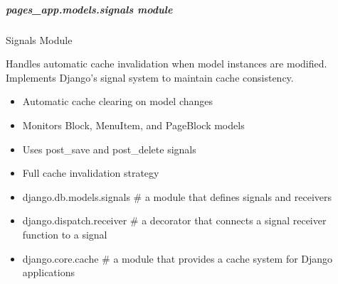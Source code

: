 \documentclass[letterpaper,10pt,english]{sphinxmanual}
\begin{document}
\subparagraph{pages\_app.models.signals module}
\label{\detokenize{pages_app.models:module-pages_app.models.signals}}\label{\detokenize{pages_app.models:pages-app-models-signals-module}}
\sphinxAtStartPar
Signals Module

\sphinxAtStartPar
Handles automatic cache invalidation when model instances are modified.
Implements Django’s signal system to maintain cache consistency.
\begin{description}
\begin{itemize}
\item {} 
\sphinxAtStartPar
Automatic cache clearing on model changes

\item {} 
\sphinxAtStartPar
Monitors Block, MenuItem, and PageBlock models

\item {} 
\sphinxAtStartPar
Uses post\_save and post\_delete signals

\item {} 
\sphinxAtStartPar
Full cache invalidation strategy

\end{itemize}

\begin{itemize}
\item {} 
\sphinxAtStartPar
django.db.models.signals \# a module that defines signals and receivers

\item {} 
\sphinxAtStartPar
django.dispatch.receiver \# a decorator that connects a signal receiver function to a signal

\item {} 
\sphinxAtStartPar
django.core.cache \# a module that provides a cache system for Django applications

\end{itemize}

\end{description}
\end{document}
